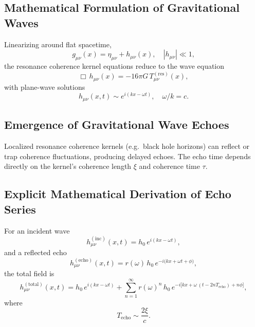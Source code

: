 \subsection{Mathematical Formulation of Gravitational Waves}

Linearizing around flat spacetime,
\begin{equation}
g_{\mu\nu}(x) = \eta_{\mu\nu} + h_{\mu\nu}(x), \quad |h_{\mu\nu}|\ll1,
\label{eq:wave_eq}
\end{equation}
the resonance coherence kernel equations reduce to the wave equation
\begin{equation}
\Box\,h_{\mu\nu}(x) = -16\pi G\,T_{\mu\nu}^{(\mathrm{res})}(x),
\label{eq:wave_eq_numbered}
\end{equation}
with plane-wave solutions
\begin{equation}
h_{\mu\nu}(x,t) \sim e^{i(kx - \omega t)},\quad \omega/k = c.
\label{eq:plane_wave}
\end{equation}

\subsection{Emergence of Gravitational Wave Echoes}

Localized resonance coherence kernels (e.g.\ black hole horizons) can reflect or trap coherence fluctuations, producing delayed echoes. The echo time depends directly on the kernel’s coherence length \(\xi\) and coherence time \(\tau\).

\subsection{Explicit Mathematical Derivation of Echo Series}

For an incident wave
\begin{equation}
h_{\mu\nu}^{(\mathrm{inc})}(x,t) = h_0\,e^{i(kx - \omega t)},
\label{eq:inc_wave}
\end{equation}
and a reflected echo
\begin{equation}
h_{\mu\nu}^{(\mathrm{echo})}(x,t) = r(\omega)\,h_0\,e^{-i\bigl(kx + \omega t + \phi\bigr)},
\label{eq:echo_wave}
\end{equation}
the total field is
\begin{equation}
h_{\mu\nu}^{(\mathrm{total})}(x,t)
= h_0\,e^{i(kx - \omega t)}
+ \sum_{n=1}^{\infty} r(\omega)^n\,h_0\,e^{-i\bigl[kx + \omega\,(t - 2nT_{\mathrm{echo}}) + n\phi\bigr]},
\label{eq:echo_series}
\end{equation}
where
\begin{equation}
T_{\mathrm{echo}} \sim \frac{2\xi}{c}.
\label{eq:echo_time}
\end{equation}

